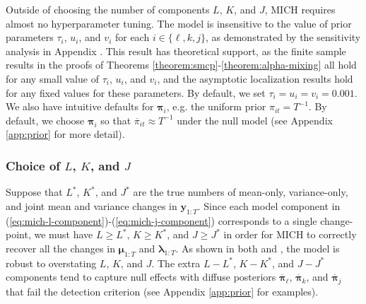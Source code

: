 Outside of choosing the number of components $L$, $K$, and $J$, MICH requires almost no hyperparameter tuning. The model is insensitive to the value of prior parameters $\tau_i$, $u_i$, and $v_i$ for each  $i \in \{\ell, k, j\}$, as demonstrated by the sensitivity analysis in Appendix . This result has theoretical support, as the finite sample results in the proofs of Theorems \ref{theorem:smcp}-\ref{theorem:alpha-mixing} all hold for any small value of $\tau_i$, $u_i$, and $v_i$, and the asymptotic localization results hold for any fixed values for these parameters. By default, we set $\tau_i = u_i = v_i = 0.001$. We also have intuitive defaults for $\boldsymbol{\pi}_i$, e.g. the uniform prior $\pi_{it} = T^{-1}$. By default, we choose $\boldsymbol{\pi}_i$ so that $\overline{\pi}_{it} \approx T^{-1}$ under the null model (see Appendix \ref{app:prior} for more detail).

\subsubsection{Choice of \texorpdfstring{$L$}{L}, \texorpdfstring{$K$}{K}, and \texorpdfstring{$J$}{J}}

Suppose that $L^*$, $K^*$, and $J^*$ are the true numbers of mean-only, variance-only, and joint mean and variance changes in $\mathbf{y}_{1:T}$. Since each model component in (\ref{eq:mich-l-component})-(\ref{eq:mich-j-component}) corresponds to a single change-point, we must have $L \geq L^*$, $K \geq K^*$, and $J \geq J^*$ in order for MICH to correctly recover all the changes in $\boldsymbol{\mu}_{1:T}$ and $\boldsymbol{\lambda}_{1:T}$. As shown in both \cite{Wang21} and \cite{Cappello22}, the model is robust to overstating $L$, $K$, and $J$. The extra $L - L^*$, $K- K^*$, and $J - J^*$ components tend to capture null effects with diffuse posteriors $\overline{\boldsymbol{\pi}}_{\ell}$, $\overline{\boldsymbol{\pi}}_{k}$, and $\overline{\boldsymbol{\pi}}_{j}$ that fail the detection criterion (see Appendix \ref{app:prior} for examples). 

